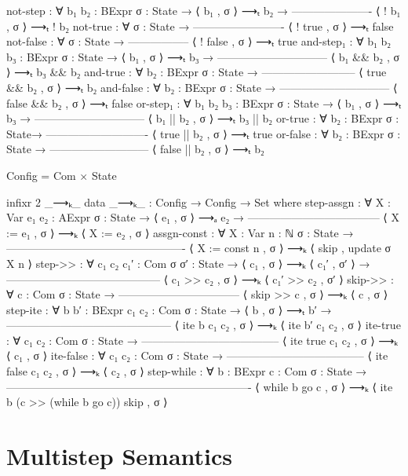 \documentclass{lecturenotes}
\begin{document}
\begin{code}[hide]
  not-step : ∀ {b₁ b₂ : BExpr} {σ : State} →
       ⟨ b₁ , σ ⟩ ⟶ₜ b₂ →
    ----------------------
     ⟨ ! b₁ , σ ⟩ ⟶ₜ ! b₂
  not-true : ∀ {σ : State} →
    -------------------------
     ⟨ ! true , σ ⟩ ⟶ₜ false
  not-false : ∀ {σ : State} → 
    -----------------
     ⟨ ! false , σ ⟩ ⟶ₜ true
  and-step₁ : ∀ {b₁ b₂ b₃ : BExpr} {σ : State} →
           ⟨ b₁ , σ ⟩ ⟶ₜ b₃ →
    ------------------------------
     ⟨ b₁ && b₂ , σ ⟩ ⟶ₜ b₃ && b₂
  and-true : ∀ {b₂ : BExpr} {σ : State} →
    --------------------------
     ⟨ true && b₂ , σ ⟩ ⟶ₜ b₂
  and-false : ∀ {b₂ : BExpr} {σ : State} →
    ------------------------------
     ⟨ false && b₂ , σ ⟩ ⟶ₜ false
  or-step₁ : ∀ {b₁ b₂ b₃ : BExpr} {σ : State} →
           ⟨ b₁ , σ ⟩ ⟶ₜ b₃ →
    ------------------------------
     ⟨ b₁ || b₂ , σ ⟩ ⟶ₜ b₃ || b₂
  or-true : ∀ {b₂ : BExpr} {σ : State}→
    ----------------------------
     ⟨ true || b₂ , σ ⟩ ⟶ₜ true
  or-false : ∀ {b₂ : BExpr} {σ : State} →
    ---------------------------
     ⟨ false || b₂ , σ ⟩ ⟶ₜ b₂

Config = Com × State

infixr 2 _⟶ₖ_
data _⟶ₖ_ : Config → Config → Set where
  step-assgn : ∀ {X : Var} {e₁ e₂ : AExpr} {σ : State} →
          ⟨ e₁ , σ ⟩ ⟶ₐ e₂ →
    ------------------------------------
     ⟨ X := e₁ , σ ⟩ ⟶ₖ ⟨ X := e₂ , σ ⟩
  assgn-const : ∀ {X : Var} {n : ℕ} {σ : State} →
    -------------------------------------------------
     ⟨ X := const n , σ ⟩ ⟶ₖ ⟨ skip , update σ X n ⟩
  step->> : ∀ {c₁ c₂ c₁′ : Com} {σ σ′ : State} →
            ⟨ c₁ , σ ⟩ ⟶ₖ ⟨ c₁′ , σ′ ⟩ →
    ------------------------------------------
     ⟨ c₁ >> c₂ , σ ⟩ ⟶ₖ ⟨ c₁′ >> c₂ , σ′ ⟩
  skip->> : ∀ {c : Com} {σ : State} →
    ---------------------------------
     ⟨ skip >> c , σ ⟩ ⟶ₖ ⟨ c , σ ⟩
  step-ite : ∀ {b b′ : BExpr} {c₁ c₂ : Com} {σ : State} →
               ⟨ b , σ ⟩ ⟶ₜ b′ →
    ---------------------------------------------
     ⟨ ite b c₁ c₂ , σ ⟩ ⟶ₖ ⟨ ite b′ c₁ c₂ , σ ⟩ 
  ite-true : ∀ {c₁ c₂ : Com} {σ : State} →
    --------------------------------------
     ⟨ ite true c₁ c₂ , σ ⟩ ⟶ₖ ⟨ c₁ , σ ⟩
  ite-false : ∀ {c₁ c₂ : Com} {σ : State} →
    --------------------------------------
     ⟨ ite false c₁ c₂ , σ ⟩ ⟶ₖ ⟨ c₂ , σ ⟩
  step-while : ∀ {b : BExpr} {c : Com} {σ : State} →
    -------------------------------------------------------------------
     ⟨ while b go c , σ ⟩ ⟶ₖ ⟨ ite b (c >> (while b go c)) skip , σ ⟩ 


\end{code}

\section{Multistep Semantics}
\label{sec:multistep-semantics}
\end{document}
